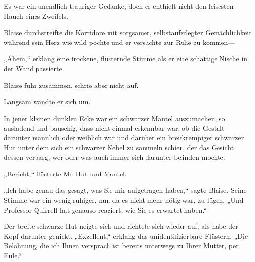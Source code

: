 Es war ein unendlich trauriger Gedanke, doch er enthielt nicht den leisesten Hauch eines Zweifels.


Blaise durchstreifte die Korridore mit sorgsamer, selbstauferlegter Gemächlichkeit während sein Herz wie wild pochte und er versuchte zur Ruhe zu kommen—

„Ähem,“ erklang eine trockene, flüsternde Stimme als er eine schattige Nische in der Wand passierte.

Blaise fuhr zusammen, schrie aber nicht auf.

Langsam wandte er sich um.

In jener kleinen dunklen Ecke war ein schwarzer Mantel auszumachen, so ausladend und bauschig, dass nicht einmal erkennbar war, ob die Gestalt darunter männlich oder weiblich war und darüber ein breitkrempiger schwarzer Hut unter dem sich ein schwarzer Nebel zu sammeln schien, der das Gesicht dessen verbarg, wer oder was auch immer sich darunter befinden mochte.

„Bericht,“ flüsterte Mr~Hut-und-Mantel.

„Ich habe genau das gesagt, was Sie mir aufgetragen haben,“ sagte Blaise. Seine Stimme war ein wenig ruhiger, nun da es nicht mehr nötig war, zu lügen. „Und Professor Quirrell hat genauso reagiert, wie Sie es erwartet haben.“

Der breite schwarze Hut neigte sich und richtete sich wieder auf, als habe der Kopf darunter genickt. „Exzellent,“ erklang das unidentifizierbare Flüstern. „Die Belohnung, die ich Ihnen versprach ist bereits unterwegs zu Ihrer Mutter, per Eule.“

